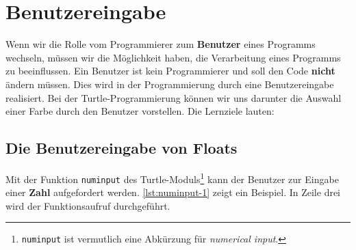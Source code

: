 
\toggletrue{image}
\toggletrue{imagehover}

\chapter{Benutzereingabe}
\label{ch:benutzereingabe}

Wenn wir die Rolle vom Programmierer zum \textbf{Benutzer} eines Programms wechseln, müssen wir die Möglichkeit haben, die Verarbeitung eines Programms zu beeinflussen. Ein Benutzer ist kein Programmierer und soll den Code \textbf{nicht} ändern müssen. Dies wird in der Programmierung durch eine Benutzereingabe realisiert. Bei der Turtle-Programmierung können wir uns darunter die Auswahl einer Farbe durch den Benutzer vorstellen. Die Lernziele lauten:\\


\section{Die Benutzereingabe von Floats}

Mit der Funktion \lstinline[language={python3}]{numinput} des Turtle-Moduls\footnote{\lstinline[language={python3}]{numinput} ist vermutlich eine Abkürzung für \textit{numerical input}.} kann der Benutzer zur Eingabe einer \textbf{Zahl} aufgefordert werden. \autoref{lst:numinput-1} zeigt ein Beispiel. In Zeile drei wird der Funktionsaufruf durchgeführt.

